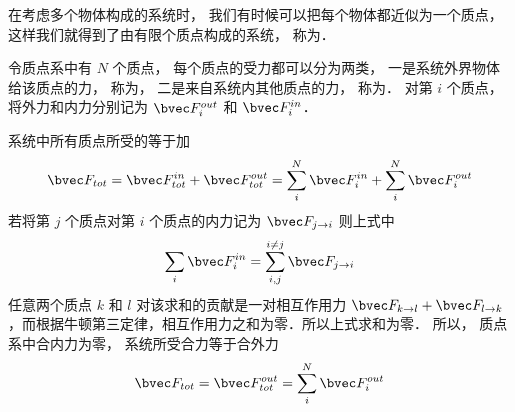 

在考虑多个物体构成的系统时， 我们有时候可以把每个物体都近似为一个质点， 这样我们就得到了由有限个质点构成的系统， 称为．

令质点系中有 $N$ 个质点， 每个质点的受力都可以分为两类， 一是系统外界物体给该质点的力， 称为， 二是来自系统内其他质点的力， 称为． 对第 $i$ 个质点， 将外力和内力分别记为 $\bvec F_i^{out}$ 和 $\bvec F_i^{in}$． 

系统中所有质点所受的等于加
\begin{equation}
\bvec F_{tot} = \bvec F_{tot}^{in} + \bvec F_{tot}^{out} = \sum_i^N \bvec F_i^{in} + \sum_i^N \bvec F_i^{out}
\end{equation}
若将第 $j$ 个质点对第 $i$ 个质点的内力记为 $\bvec F_{j\to i}$ 则上式中
\begin{equation}
\sum_i \bvec F_i^{in} = \sum_{i,j}^{i \ne j} \bvec F_{j \to i}
\end{equation}
任意两个质点 $k$ 和 $l$ 对该求和的贡献是一对相互作用力 $\bvec F_{k \to l} + \bvec F_{l \to k}$，而根据牛顿第三定律，相互作用力之和为零．所以上式求和为零． 所以， 质点系中合内力为零， 系统所受合力等于合外力
\begin{equation}
\bvec F_{tot} = \bvec F_{tot}^{out} = \sum_i^N \bvec F_i^{out}
\end{equation}